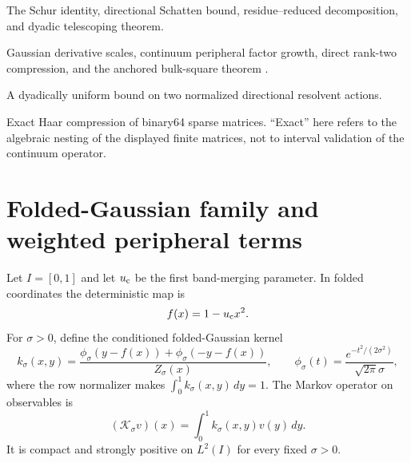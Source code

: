 \documentclass[11pt]{article}
\theoremstyle{definition}
\theoremstyle{remark}
\newcommand{\cK}{\mathcal K}
\begin{document}
\begin{description}[leftmargin=3.8cm,style=nextline]
 \item[Unconditional operator theory]
 The Schur identity, directional Schatten bound, residue--reduced
 decomposition, and dyadic telescoping theorem.

 \item[Previously proved analytic input]
 Gaussian derivative scales, continuum peripheral factor growth, direct
 rank-two compression, and the anchored bulk-square theorem
 \citep{WangSmallNoiseMesh2026,WangLogConditioning2026}.

 \item[Explicit remaining condition]
 A dyadically uniform bound on two normalized directional resolvent actions.

 \item[Floating diagnostic]
 Exact Haar compression of binary64 sparse matrices.  ``Exact'' here refers
 to the algebraic nesting of the displayed finite matrices, not to interval
 validation of the continuum operator.
\end{description}

\section{Folded-Gaussian family and weighted peripheral terms}
\label{sec:setup}

Let $I=[0,1]$ and let $u_{\rm c}$ be the first band-merging parameter.  In
folded coordinates the deterministic map is
\begin{equation}
 f(x)=1-u_{\rm c}x^2.
 \label{eq:map}
\end{equation}
For $\sigma>0$, define the conditioned folded-Gaussian kernel
\begin{equation}
 k_\sigma(x,y)
 =\frac{\phi_\sigma(y-f(x))+\phi_\sigma(-y-f(x))}
 {Z_\sigma(x)},
 \qquad
 \phi_\sigma(t)=\frac{e^{-t^2/(2\sigma^2)}}
 {\sqrt{2\pi}\sigma},
 \label{eq:kernel}
\end{equation}
where the row normalizer makes
$\int_0^1k_\sigma(x,y)\,dy=1$.  The Markov operator on observables is
\begin{equation}
 (\cK_\sigma v)(x)=\int_0^1k_\sigma(x,y)v(y)\,dy.
 \label{eq:operator}
\end{equation}
It is compact and strongly positive on $L^2(I)$ for every fixed
$\sigma>0$.
\end{document}
